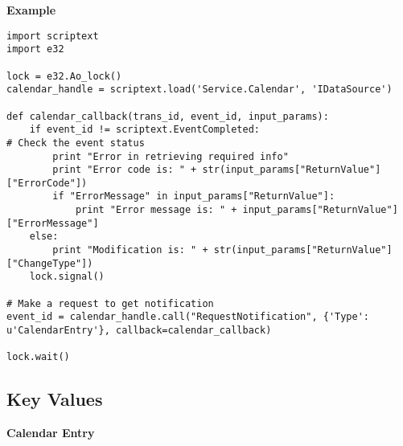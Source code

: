 {\bf Example} \break

\begin{verbatim}
import scriptext
import e32

lock = e32.Ao_lock()
calendar_handle = scriptext.load('Service.Calendar', 'IDataSource')

def calendar_callback(trans_id, event_id, input_params):
    if event_id != scriptext.EventCompleted:   
# Check the event status
        print "Error in retrieving required info"
        print "Error code is: " + str(input_params["ReturnValue"]["ErrorCode"])
        if "ErrorMessage" in input_params["ReturnValue"]:
            print "Error message is: " + input_params["ReturnValue"]["ErrorMessage"]
    else:
        print "Modification is: " + str(input_params["ReturnValue"]["ChangeType"])
    lock.signal()

# Make a request to get notification
event_id = calendar_handle.call("RequestNotification", {'Type': u'CalendarEntry'}, callback=calendar_callback)

lock.wait()
\end{verbatim}

\subsection{Key Values}
\label{subsec:calendarkeyval}

{\bf Calendar Entry} \break

